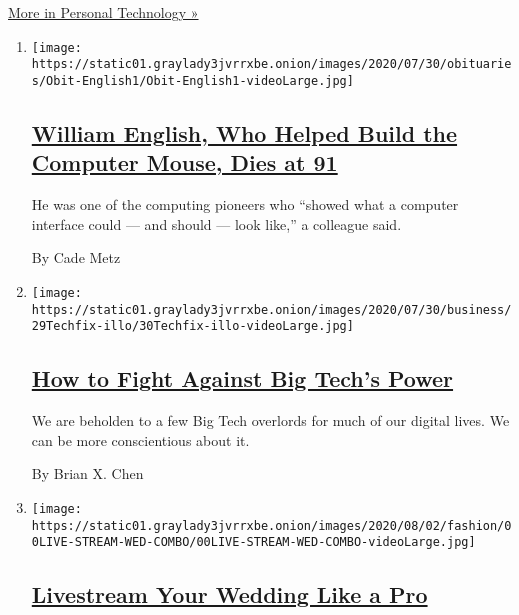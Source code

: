 \href{/section/technology/personaltech}{More in Personal Technology »}

\begin{enumerate}
\def\labelenumi{\arabic{enumi}.}
\item
  \texttt{[image: https://static01.graylady3jvrrxbe.onion/images/2020/07/30/obituaries/Obit-English1/Obit-English1-videoLarge.jpg]}

  \hypertarget{william-english-who-helped-build-the-computer-mouse-dies-at-91}{%
  \subsection{\texorpdfstring{\href{/2020/07/31/technology/william-english-who-helped-build-the-computer-mouse-dies-at-91.html}{William
  English, Who Helped Build the Computer Mouse, Dies at
  91}}{William English, Who Helped Build the Computer Mouse, Dies at 91}}\label{william-english-who-helped-build-the-computer-mouse-dies-at-91}}

  He was one of the computing pioneers who ``showed what a computer
  interface could --- and should --- look like,'' a colleague said.

  By Cade Metz
\item
  \texttt{[image: https://static01.graylady3jvrrxbe.onion/images/2020/07/30/business/29Techfix-illo/30Techfix-illo-videoLarge.jpg]}

  \hypertarget{how-to-fight-against-big-techs-power}{%
  \subsection{\texorpdfstring{\href{/2020/07/29/technology/personaltech/big-tech-power-how-to-fight.html}{How
  to Fight Against Big Tech's
  Power}}{How to Fight Against Big Tech's Power}}\label{how-to-fight-against-big-techs-power}}

  We are beholden to a few Big Tech overlords for much of our digital
  lives. We can be more conscientious about it.

  By Brian X. Chen
\item
  \texttt{[image: https://static01.graylady3jvrrxbe.onion/images/2020/08/02/fashion/00LIVE-STREAM-WED-COMBO/00LIVE-STREAM-WED-COMBO-videoLarge.jpg]}

  \hypertarget{livestream-your-wedding-like-a-pro}{%
  \subsection{\texorpdfstring{\href{/2020/07/28/fashion/weddings/livestream-your-wedding-like-a-pro.html}{Livestream
  Your Wedding Like a
  Pro}}{Livestream Your Wedding Like a Pro}}\label{livestream-your-wedding-like-a-pro}}


\end{enumerate}
